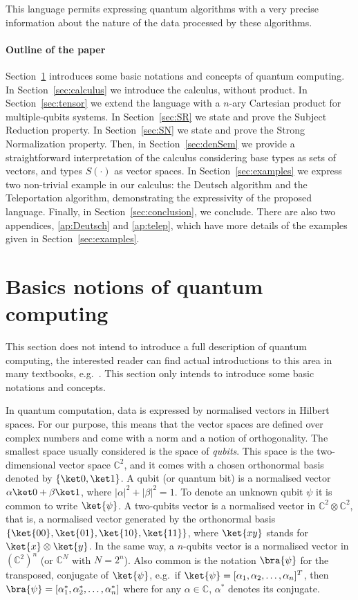 \documentclass[preprint]{elsarticle}
\begin{document}
This language permits expressing quantum algorithms with a very precise
information about the nature of the data processed by these algorithms.

\paragraph*{Outline of the paper}

Section~\ref{sec:QC} introduces some basic notations and concepts of quantum computing.
In Section~\ref{sec:calculus} we introduce the calculus, without product. In
Section~\ref{sec:tensor} we extend the language with a $n$-ary Cartesian product
for multiple-qubits systems. In Section~\ref{sec:SR} we state and prove the
Subject Reduction property. In Section~\ref{sec:SN} we state and prove the
Strong Normalization property. Then, in Section~\ref{sec:denSem} we provide a
straightforward interpretation of the calculus considering base types as sets of
vectors, and types $S(\cdot)$ as vector spaces. In Section~\ref{sec:examples} we
express two non-trivial example in our calculus: the Deutsch algorithm and the
Teleportation algorithm, demonstrating the expressivity of the proposed
language. Finally, in Section~\ref{sec:conclusion}, we conclude. There are also
two appendices, \ref{ap:Deutsch} and \ref{ap:telep}, which have more details of the
examples given in Section~\ref{sec:examples}.

\section{Basics notions of quantum computing}\label{sec:QC}
This section does not intend to introduce a full description of quantum
computing, the interested reader can find actual introductions to this area in
many textbooks, e.g.~\cite{NielsenChuang00,Jaeger07}. This section only intends
to introduce some basic notations and concepts.

In quantum computation, data is expressed by normalised vectors in Hilbert
spaces. For our purpose, this means that the vector spaces are defined over
complex numbers and come with a norm and a notion of orthogonality. The smallest
space usually considered is the space of {\em qubits}. This space is the
two-dimensional vector space $\mathbb{C}^2$, and it comes with a chosen
orthonormal basis denoted by $\{\ket0, \ket1\}$. A qubit (or quantum bit) is a
normalised vector $\alpha\ket0 + \beta\ket1$, where $|\alpha|^2 +|\beta|^2=1$.
To denote an unknown qubit $\psi$ it is common to write $\ket{\psi}$. A
two-qubits vector is a normalised vector in $\mathbb{C}^2\otimes\mathbb{C}^2$,
that is, a normalised vector generated by the orthonormal basis
$\{\ket{00},\ket{01},\ket{10},\ket{11}\}$, where $\ket{xy}$ stands for
$\ket{x}\otimes\ket{y}$. In the same way, a $n$-qubits vector is a normalised
vector in $(\mathbb{C}^2)^n$ (or $\mathbb{C}^N$ with $N=2^n$). Also common is
the notation $\bra{\psi}$ for the transposed, conjugate of $\ket{\psi}$, e.g.~if
$\ket{\psi}=[\alpha_1,\alpha_2,\dots,\alpha_n]^T$, then
$\bra{\psi}=[\alpha_1^*,\alpha^*_2,\dots,\alpha_n^*]$ where for any
$\alpha\in\mathbb{C}$, $\alpha^*$ denotes its conjugate.
\end{document}
